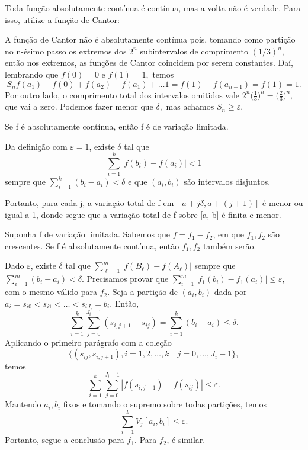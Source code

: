 \documentclass[measure_theory.tex]{subfiles}
\begin{document}
Toda função absolutamente contínua é contínua, mas a volta não é verdade. Para isso, utilize a função de Cantor:
\begin{example}
	A função de Cantor não é absolutamente contínua pois, tomando como partição no n-ésimo passo os extremos dos \(2^{n}\) subintervalos de comprimento \((1/3)^{n},\) então nos extremos, as funções de Cantor coincidem por serem constantes. Daí, lembrando que \(f(0) = 0 \) e \(f(1) = 1,\) temos
	\[
		S_{n} f(a_1) - f(0) + f(a_2) - f(a_1) + \dotsc  1 = f(1) - f(a_{n-1}) = f(1) = 1.
	\]
	Por outro lado, o comprimento total dos intervalos omitidos vale \(2^{n}\biggl(\frac{1}{3}\biggr)^{n} = \biggl(\frac{2}{3}\biggr)^{n},\) que vai a zero. Podemos fazer menor que \(\delta ,\) mas achamos \(S_{n} \geq \varepsilon \).
\end{example}
\begin{lemma*}
	Se f é absolutamente contínua, então f é de variação limitada.
\end{lemma*}
\begin{proof*}
	Da definição com \(\varepsilon  = 1\), existe \(\delta  \) tal que
	\[
		\sum\limits_{i=1}^{k}|f(b_{i}) - f(a_{i})| < 1
	\]
	sempre que \(\sum\limits_{i=1}^{k}(b_{i} - a_{i}) < \delta \) e que \((a_{i}, b_{i})\) são intervalos disjuntos.

	Portanto, para cada j, a variação total de f em \([a + j\delta, a + (j+1)]\) é menor ou igual a 1, donde segue que a variação total de f sobre [a, b] é finita e menor. \qedsymbol
\end{proof*}
\begin{lemma*}
	Suponha f de variação limitada. Sabemos que \( f = f_1 - f_2\), em que \(f_1, f_2\) são crescentes. Se f é absolutamente contínua, então \(f_1, f_2\) também serão.
\end{lemma*}
\begin{proof*}
	Dado \(\varepsilon \), existe \(\delta \) tal que \(\sum\limits_{\ell =1}^{m}|f(B_{\ell }) - f(A_{\ell })|\) sempre que \(\sum\limits_{i=1}^{m}(b_{i}-a_{i}) < \delta .\) Precisamos provar que \(\sum\limits_{i=1}^{m}|f_1(b_{i}) - f_1(a_{i})|\leq \varepsilon ,\) com o mesmo válido para \(f_2\).
	Seja a partição de \((a_{i}, b_{i})\) dada por \(a_{i} = s_{i0} < s_{i1} < \dotsc <s_{iJ_{i}} = b_{i}.\) Então,
	\[
		\sum\limits_{i=1}^{k}\sum\limits_{j=0}^{J_{i}-1}(s_{i, j+1} - s_{ij}) = \sum\limits_{i=1}^{k}(b_{i}-a_{i})\leq \delta .
	\]
	Aplicando o primeiro parágrafo com a coleção
	\[
		\{(s_{ij}, s_{i, j+1}), i = 1, 2, \dotsc , k\quad j = 0, \dotsc , J_{i}-1\},
	\]
	temos
	\[
		\sum\limits_{i=1}^{k}\sum\limits_{j=0}^{J_{i}-1}|f(s_{i, j+1}) - f(s_{ij})|\leq \varepsilon .
	\]
	Mantendo \(a_{i}, b_{i}\) fixos e tomando o supremo sobre todas partições, temos
	\[
		\sum\limits_{i=1}^{k}V_j[a_{i}, b_{i}] \leq \varepsilon .
	\]
	Portanto, segue a conclusão para \(f_1.\) Para \(f_2\), é similar. \qedsymbol
\end{proof*}
\end{document}
